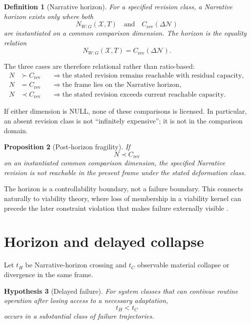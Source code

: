 \documentclass[11pt,a4paper]{article}
\newtheorem{definition}{Definition}[section]
\newtheorem{proposition}[definition]{Proposition}
\newtheorem{hypothesis}[definition]{Hypothesis}
\theoremstyle{remark}
\newcommand{\Narr}{\mathcal N}
\begin{document}
\begin{definition}[Narrative horizon]\label{def:horizon}
For a specified revision class, a Narrative horizon exists only where both
\[
N_{W:G}(\mathcal X,T)
\quad\text{and}\quad
C_{\mathrm{rev}}(\Delta\Narr)
\]
are instantiated on a common comparison dimension. The horizon is the equality relation
\[
\boxed{
N_{W:G}(\mathcal X,T)
=
C_{\mathrm{rev}}(\Delta\Narr).
}
\]
\end{definition}

The three cases are therefore relational rather than ratio-based:
\[
\begin{aligned}
N &\succ C_{\mathrm{rev}}
&&\Rightarrow \text{the stated revision remains reachable with residual capacity},\\
N &= C_{\mathrm{rev}}
&&\Rightarrow \text{the frame lies on the Narrative horizon},\\
N &\prec C_{\mathrm{rev}}
&&\Rightarrow \text{the stated revision exceeds current reachable capacity}.
\end{aligned}
\]

If either dimension is NULL, none of these comparisons is licensed. In particular, an absent revision class is not ``infinitely expensive''; it is not in the comparison domain.

\begin{proposition}[Post-horizon fragility]\label{prop:post-horizon}
If
\[
N\prec C_{\mathrm{rev}}
\]
on an instantiated common comparison dimension, the specified Narrative revision is not reachable in the present frame under the stated deformation class.
\end{proposition}

The horizon is a controllability boundary, not a failure boundary. This connects naturally to viability theory, where loss of membership in a viability kernel can precede the later constraint violation that makes failure externally visible \citep{aubin1991viability,aubin2011newdirections}.

\section{Horizon and delayed collapse}\label{sec:delayed-collapse}

Let $t_H$ be Narrative-horizon crossing and $t_C$ observable material collapse or divergence in the same frame.

\begin{hypothesis}[Delayed failure]\label{hyp:delayed-failure}
For system classes that can continue routine operation after losing access to a necessary adaptation,
\[
\boxed{
t_H<t_C
}
\]
occurs in a substantial class of failure trajectories.
\end{hypothesis}
\end{document}
